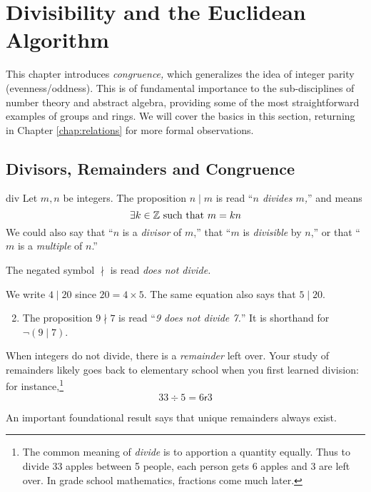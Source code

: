 \section{Divisibility and the Euclidean Algorithm}\label{chap:gcd}


This chapter introduces \emph{congruence,} which generalizes the idea of integer parity (evenness/oddness). This is of fundamental importance to the sub-disciplines of number theory and abstract algebra, providing some of the most straightforward examples of groups and rings. We will cover the basics in this section, returning in Chapter \ref{chap:relations} for more formal observations.


\subsection{Divisors, Remainders and Congruence}\label{sec:cong}


\begin{defn}{}{div}
	Let $m,n$ be integers. The proposition $n\mid m$ is read ``\emph{$n$ divides $m$,}'' and means
	\[
		\exists k\in\mathbb{Z}\text{ such that }m=kn
	\]
	We could also say that ``$n$ is a \emph{divisor} of $m$,'' that ``$m$ is \emph{divisible} by $n$,'' or that ``$m$ is a \emph{multiple} of $n$.''
\end{defn}

The negated symbol $\nmid$ is read \emph{does not divide.}

\begin{examples}{}{}
	\exstart We write $4\mid 20$ since $20=4\times 5$. The same equation also says that $5\mid 20$.
	\begin{enumerate}\setcounter{enumi}{1}
		\item The proposition $9\nmid 7$ is read ``\emph{9 does not divide 7.}'' It is shorthand for $\neg(9\mid 7)$.
	\end{enumerate}
\end{examples}

When integers do not divide, there is a \emph{remainder} left over. Your study of remainders likely goes back to elementary school when you first learned division: for instance,\footnote{The common meaning of \emph{divide} is to apportion a quantity equally. Thus to divide 33 apples between 5 people, each person gets 6 apples and 3 are left over. In grade school mathematics, fractions come much later.}
\[
	33\div 5=6\mathbin{\mathsf r}3 \tag{``6 remainder 3''}
\]

An important foundational result says that unique remainders always exist.


